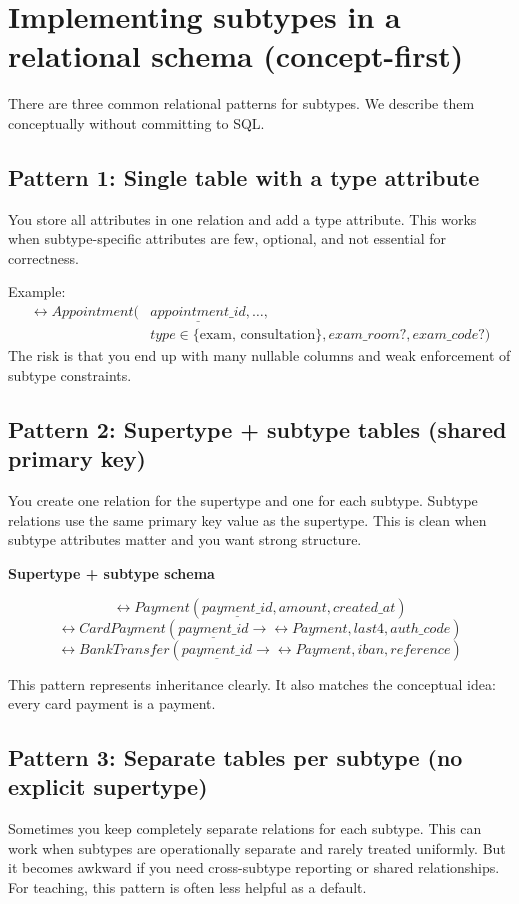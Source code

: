 \section{Implementing subtypes in a relational schema (concept-first)}
There are three common relational patterns for subtypes.
We describe them conceptually without committing to SQL.

\subsection{Pattern 1: Single table with a type attribute}
You store all attributes in one relation and add a type attribute.
This works when subtype-specific attributes are few, optional, and not essential for correctness.

Example:
\[
\begin{aligned}
\rel{Appointment}(&\underline{appointment\_id}, \dots, \\
&type \in \{\text{exam, consultation}\}, exam\_room?, exam\_code?)
\end{aligned}
\]
The risk is that you end up with many nullable columns and weak enforcement of subtype constraints.

\subsection{Pattern 2: Supertype + subtype tables (shared primary key)}
You create one relation for the supertype and one for each subtype.
Subtype relations use the same primary key value as the supertype.
This is clean when subtype attributes matter and you want strong structure.

\begin{examplebox}
\textbf{Supertype + subtype schema}\par\smallskip
\[
\rel{Payment}(\underline{payment\_id}, amount, created\_at)
\]
\[
\rel{CardPayment}(\underline{payment\_id} \rightarrow \rel{Payment}, last4, auth\_code)
\]
\[
\rel{BankTransfer}(\underline{payment\_id} \rightarrow \rel{Payment}, iban, reference)
\]
\end{examplebox}

This pattern represents inheritance clearly.
It also matches the conceptual idea: every card payment is a payment.

\subsection{Pattern 3: Separate tables per subtype (no explicit supertype)}
Sometimes you keep completely separate relations for each subtype.
This can work when subtypes are operationally separate and rarely treated uniformly.
But it becomes awkward if you need cross-subtype reporting or shared relationships.
For teaching, this pattern is often less helpful as a default.

